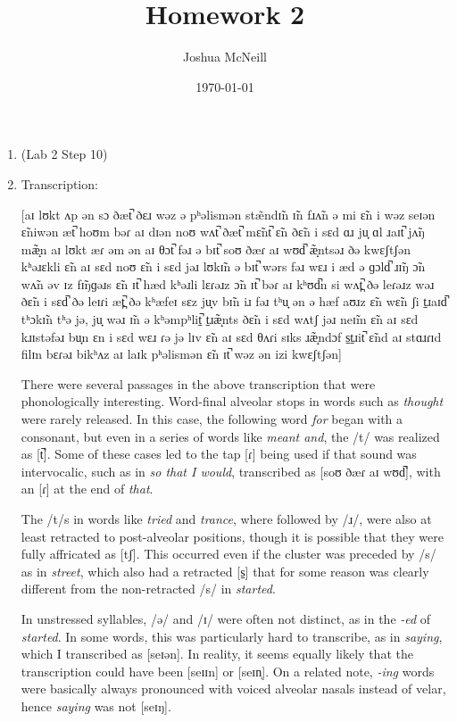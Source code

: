 \documentclass{article}
\author{Joshua McNeill}
\title{Homework 2}
\date{\today}
\newcommand{\lexi}[1]{\textit{#1}}
\begin{document}
  \maketitle
  \begin{enumerate}
    \item (Lab 2 Step 10)
    \item Transcription:

    [aɪ lʊkt ʌp ən sɔ ðæt̚ ðɛɹ wəz ə pʰəlismən stæ̃ndɪ̃n ɪ̃n fɹʌ̃n ə mi ɛ̃n i wəz seɪən ɛ̃niwən æt̚ hoʊm bəɾ aɪ dɪən noʊ wʌt̚ ðæt̚ mɛ̃nt̚ ɛ̃n ðɛ̃n i sɛd ɑɹ ju̟ ɑl ɹaɪt̚ jʌ̃ŋ mæ̝̃n aɪ lʊkt æɾ əm ən aɪ θɔt̚ fəɹ ə bɪt̚ soʊ ðæɾ aɪ wʊd̚ æ̝̃ntsəɹ ðə kwɛʃtʃən kʰəɹɛkli ɛ̃n aɪ sɛd noʊ ɛ̃n i sɛd jəɹ lʊkɪ̃n ə bɪt̚ wərs fəɹ wɛɹ i æd ə ɡɔld̚ ɹɪ̃ŋ ɔ̃n wʌ̃n əv ɪz fɪ̃ŋɡəɹs ɛ̃n ɪt̚ hæd kʰəɹli lɛɾəɹz ɔ̃n ɪt̚ bəɾ aɪ kʰʊd̚n si wʌt̪̚ ðə leɾəɹz wəɹ ðɛ̃n i sɛd̚ ðə leɪɾi æt̪̚ ðə kʰæfeɪ sɛz ju̟v bɪ̃n iɹ fəɹ tʰu̟ ən ə hæf aʊɹz ɛ̃n wɛ̃n ʃi t̠ɹaɪd̚ tʰɔkɪ̃n tʰə jə, ju̟ wəɹ ɪ̃n ə kʰəmpʰlit̠̚ t̠ɹæ̝̃nts ðɛ̃n i sɛd wʌtʃ jəɹ neɪ̃m ɛ̃n aɪ sɛd kɹɪstəfəɹ bu̟n ɛn i sɛd wɛɹ ɾə jə lɪv ɛ̃n aɪ sɛd θʌɾi sɪks ɹæ̝̃ndɔf s̠t̠ɹit̚ ɛ̃nd aɪ stɑɹɾɪd filɪn bɛɾəɹ bikʰʌz aɪ laɪk pʰəlismən ɛ̃n ɪt̚ wəz ən izi kwɛʃtʃən]

    There were several passages in the above transcription that were phonologically interesting. Word-final alveolar stops in words such as \lexi{thought} were rarely released. In this case, the following word \lexi{for} began with a consonant, but even in a series of words like \lexi{meant and}, the /t/ was realized as [t̚]. Some of these cases led to the tap [ɾ] being used if that sound was intervocalic, such as in \lexi{so that I would}, transcribed as [soʊ ðæɾ aɪ wʊd̚], with an [ɾ] at the end of \lexi{that}.

    The /t/s in words like \lexi{tried} and \lexi{trance}, where followed by /ɹ/, were also at least retracted to post-alveolar positions, though it is possible that they were fully affricated as [tʃ]. This occurred even if the cluster was preceded by /s/ as in \lexi{street}, which also had a retracted [s̠] that for some reason was clearly different from the non-retracted /s/ in \lexi{started}.

    In unstressed syllables, /ə/ and /ɪ/ were often not distinct, as in the \lexi{-ed} of \lexi{started}. In some words, this was particularly hard to transcribe, as in \lexi{saying}, which I transcribed as [seɪən]. In reality, it seems equally likely that the transcription could have been [seɪɪn] or [seɪn̩]. On a related note, \lexi{-ing} words were basically always pronounced with voiced alveolar nasals instead of velar, hence \lexi{saying} was not [seɪŋ].


\end{enumerate}
\end{document}
